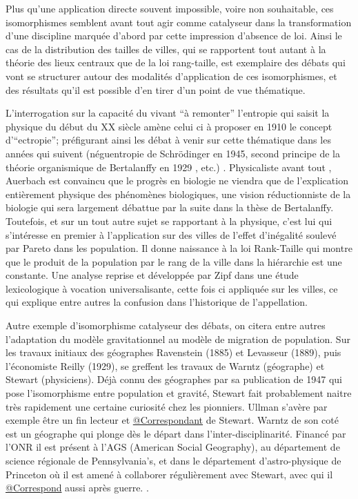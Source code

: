 Plus qu'une application directe souvent impossible, voire non souhaitable, ces isomorphismes semblent avant tout agir comme catalyseur dans la transformation d'une discipline marquée d'abord par cette impression d'absence de loi. Ainsi le cas de la distribution des tailles de villes, qui se rapportent tout autant à la théorie des lieux centraux que de la loi rang-taille, est exemplaire des débats qui vont se structurer autour des modalités d'application de ces isomorphismes, et des résultats qu'il est possible d'en tirer d'un point de vue thématique. 

L'interrogation sur la capacité du vivant \enquote{à remonter} l'entropie qui saisit la physique du début du XX siècle amène celui ci à proposer en 1910 le concept d'\enquote{ectropie}; préfigurant ainsi les débat à venir sur cette thématique dans les années qui suivent (néguentropie de Schrödinger en 1945, second principe de la théorie organismique de Bertalanffy en 1929 \autocite[475]{Pouvreau2013}, etc.) \autocite[80]{Pouvreau2013}. Physicaliste avant tout \autocite[87]{Pouvreau2013}, Auerbach est convaincu que le progrès en biologie ne viendra que de l'explication entièrement physique des phénomènes biologiques, une vision réductionniste de la biologie qui sera largement débattue par la suite dans la thèse de Bertalanffy. Toutefois, et sur un tout autre sujet se rapportant à la physique, c'est lui qui s’intéresse en premier à l'application sur des villes de l'effet d'inégalité soulevé par Pareto dans les population.\autocite{Auerbach1913} Il donne naissance à la loi Rank-Taille qui montre que le produit de la population par le rang de la ville dans la hiérarchie est une constante. Une analyse reprise et développée par Zipf dans une étude lexicologique à vocation universalisante, cette fois ci appliquée sur les villes, ce qui explique entre autres la confusion dans l’historique de l’appellation.

Autre exemple d'isomorphisme catalyseur des débats, on citera entre autres l'adaptation du modèle gravitationnel au modèle de migration de population. Sur les travaux initiaux des géographes Ravenstein (1885) et Levasseur (1889), puis l'économiste Reilly (1929), se greffent les travaux de Warntz (géographe) et Stewart (physiciens). Déjà connu des géographes par sa publication de 1947 qui pose l'isomorphisme entre population et gravité, Stewart fait probablement naitre très rapidement une certaine curiosité chez les pionniers. Ullman s'avère par exemple être un fin lecteur \autocite[61]{Glick1988} et \href{http://nwda.orbiscascade.org/ark:/80444/xv01385}{@Correspondant} de Stewart. Warntz de son coté est un géographe qui plonge dès le départ dans l'inter-disciplinarité. Financé par l'ONR il est présent à l'AGS (American Social Geography), au département de science régionale de Pennsylvania's, et dans le département d'astro-physique de Princeton où il est amené à collaborer régulièrement avec Stewart, avec qui il \href{http://rmc.library.cornell.edu/EAD/htmldocs/RMM04392.html}{@Correspond} aussi après guerre. \autocite{Barnes2006a}. 


